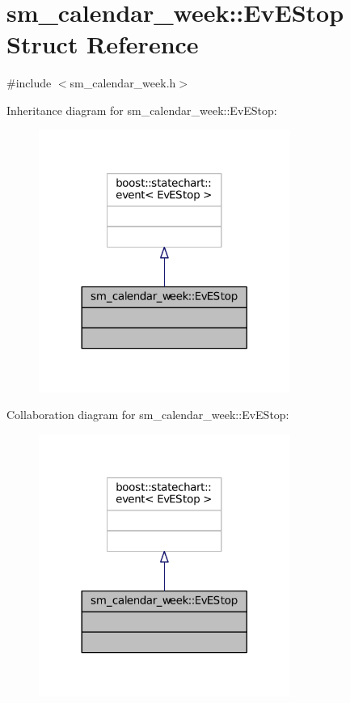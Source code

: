 \hypertarget{structsm__calendar__week_1_1EvEStop}{}\section{sm\+\_\+calendar\+\_\+week\+:\+:Ev\+E\+Stop Struct Reference}
\label{structsm__calendar__week_1_1EvEStop}


{\ttfamily \#include $<$sm\+\_\+calendar\+\_\+week.\+h$>$}



Inheritance diagram for sm\+\_\+calendar\+\_\+week\+:\+:Ev\+E\+Stop\+:
\nopagebreak
\begin{figure}[H]
\begin{center}
\leavevmode
\includegraphics[width=233pt]{structsm__calendar__week_1_1EvEStop__inherit__graph}
\end{center}
\end{figure}


Collaboration diagram for sm\+\_\+calendar\+\_\+week\+:\+:Ev\+E\+Stop\+:
\nopagebreak
\begin{figure}[H]
\begin{center}
\leavevmode
\includegraphics[width=233pt]{structsm__calendar__week_1_1EvEStop__coll__graph}
\end{center}
\end{figure}


